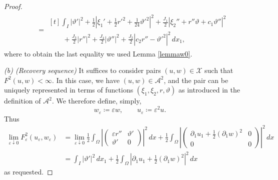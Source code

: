 \documentclass[a4, 11pt, reqno, final]{amsart}
\newcommand\e{\varepsilon}
\theoremstyle{plain}%
\newcommand{\QED}{\hspace{1ex}\hfill$\blacksquare$\vspace{2ex}}
\begin{document}
\begin{proof}
$$\begin{aligned}
			&=\begin{multlined}[t] \int_I |\vartheta'|^2 + \frac12  |\xi_1'+ \frac12 r'^2 + \frac{1}{24}\vartheta'^2|^2 +\frac{J_1}{2} |\xi_2'' + r''\vartheta + c_1\vartheta''|^2 \\
				\qquad+\frac{J_3}{2}  |r''|^2  +\frac{J_4}{2}  |\vartheta''|^2  +\frac{J_2}{2} |c_2 r'' - \vartheta'^2|^2 \, dx_1,
			\end{multlined}
		\end{aligned}
		$$
		where to obtain the last equality we used Lemma \ref{lemmaw0}.

		{\it {(b) (Recovery sequence)}}
		It suffices to consider pairs $(u, w) \in \mathcal{X}$ such that $F^2(u, w) < \infty$. In this case, we have $(u, w) \in \mathcal{A}^{2}$, and the pair can be uniquely represented in terms of functions $(\xi_1, \xi_2, r, \vartheta)$ as introduced in the definition of $\mathcal{A}^{2}$. We therefore define, simply,
		$$ w_\e \coloneqq   \e w, \qquad u_\e \coloneqq    \e^2 u.$$
		Thus
		$$ \begin{aligned}
			\lim_{\e\downarrow 0}	F_{\e}^2(u_\e, w_\e) &= \lim_{\e\downarrow 0}\frac{1}{2} \int_\Omega |\begin{pmatrix}
				\e r'' & \vartheta'\\
				\vartheta' & 0
			\end{pmatrix}|^2 \, dx + \frac12 \int_\Omega |\begin{pmatrix}
				\partial_1 u_1 + \frac12 (\partial_1 w)^2 & 0\\
				0 & 0
			\end{pmatrix}|^2 \, dx\\
			&= \int_I |\vartheta'|^2 \,dx_1 + \frac12\int_\Omega | \partial_1 u_1 + \frac12 (\partial_1 w)^2 |^2 \,dx
		\end{aligned}$$
		as requested.
	\end{proof}
\end{document}
